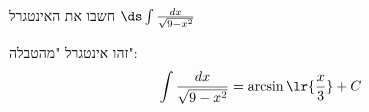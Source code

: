 חשבו את האינטגרל
$\ds \int \frac{dx}{\sqrt{9-x^2}}$
\begin{solbox}
זהו אינטגרל "מהטבלה":
\begin{align*}
\int \frac{dx}{\sqrt{9-x^2}}=\arcsin\lr{\frac{x}{3}}+C
\end{align*}
\end{solbox}
